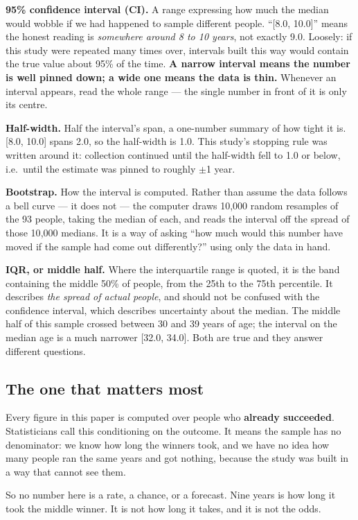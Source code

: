 \documentclass[11pt]{article}
\begin{document}
\textbf{95\% confidence interval (CI).} A range expressing how much the median
would wobble if we had happened to sample different people. ``[8.0, 10.0]''
means the honest reading is \emph{somewhere around 8 to 10 years}, not exactly
9.0. Loosely: if this study were repeated many times over, intervals built this
way would contain the true value about 95\% of the time. \textbf{A narrow
interval means the number is well pinned down; a wide one means the data is
thin.} Whenever an interval appears, read the whole range --- the single number
in front of it is only its centre.

\textbf{Half-width.} Half the interval's span, a one-number summary of how tight
it is. [8.0, 10.0] spans 2.0, so the half-width is 1.0. This study's stopping
rule was written around it: collection continued until the half-width fell to
1.0 or below, i.e.\ until the estimate was pinned to roughly $\pm$1 year.

\textbf{Bootstrap.} How the interval is computed. Rather than assume the data
follows a bell curve --- it does not --- the computer draws 10{,}000 random
resamples of the 93 people, taking the median of each, and reads the interval
off the spread of those 10{,}000 medians. It is a way of asking ``how much would
this number have moved if the sample had come out differently?'' using only the
data in hand.

\textbf{IQR, or middle half.} Where the interquartile range is quoted, it is the
band containing the middle 50\% of people, from the 25th to the 75th percentile.
It describes \emph{the spread of actual people}, and should not be confused with
the confidence interval, which describes uncertainty about the median. The
middle half of this sample crossed between 30 and 39 years of age; the interval
on the median age is a much narrower [32.0, 34.0]. Both are true and they answer
different questions.

\subsection*{The one that matters most}

Every figure in this paper is computed over people who \textbf{already
succeeded}. Statisticians call this conditioning on the outcome. It means the
sample has no denominator: we know how long the winners took, and we have no
idea how many people ran the same years and got nothing, because the study was
built in a way that cannot see them.

So no number here is a rate, a chance, or a forecast. Nine years is how long it
took the middle winner. It is not how long it takes, and it is not the odds.
\end{document}
